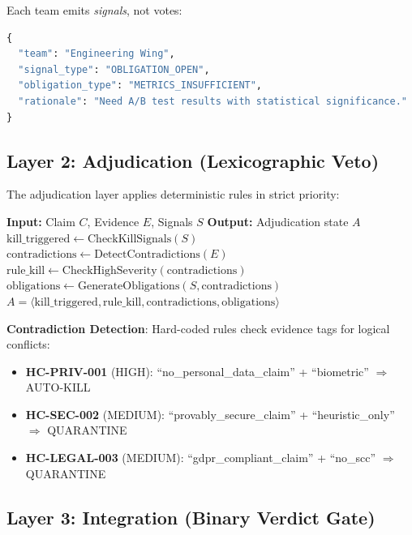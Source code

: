 \documentclass[11pt, letterpaper]{article}
\begin{document}
Each team emits \textit{signals}, not votes:

\begin{lstlisting}[language=Python, caption=Signal emission example]
{
  "team": "Engineering Wing",
  "signal_type": "OBLIGATION_OPEN",
  "obligation_type": "METRICS_INSUFFICIENT",
  "rationale": "Need A/B test results with statistical significance."
}
\end{lstlisting}

\subsection{Layer 2: Adjudication (Lexicographic Veto)}

The adjudication layer applies deterministic rules in strict priority:

\begin{algorithm}
\caption{Adjudication Pipeline}
\begin{algorithmic}[1]
\STATE \textbf{Input:} Claim $C$, Evidence $E$, Signals $S$
\STATE \textbf{Output:} Adjudication state $A$
\STATE
\STATE $\text{kill\_triggered} \gets \text{CheckKillSignals}(S)$
\STATE $\text{contradictions} \gets \text{DetectContradictions}(E)$
\STATE $\text{rule\_kill} \gets \text{CheckHighSeverity}(\text{contradictions})$
\STATE $\text{obligations} \gets \text{GenerateObligations}(S, \text{contradictions})$
\STATE
\RETURN $A = \langle \text{kill\_triggered}, \text{rule\_kill}, \text{contradictions}, \text{obligations} \rangle$
\end{algorithmic}
\end{algorithm}

\textbf{Contradiction Detection}: Hard-coded rules check evidence tags for logical conflicts:

\begin{itemize}
    \item \textbf{HC-PRIV-001} (HIGH): ``no\_personal\_data\_claim'' + ``biometric'' $\Rightarrow$ AUTO-KILL
    \item \textbf{HC-SEC-002} (MEDIUM): ``provably\_secure\_claim'' + ``heuristic\_only'' $\Rightarrow$ QUARANTINE
    \item \textbf{HC-LEGAL-003} (MEDIUM): ``gdpr\_compliant\_claim'' + ``no\_scc'' $\Rightarrow$ QUARANTINE
\end{itemize}

\subsection{Layer 3: Integration (Binary Verdict Gate)}
\end{document}
